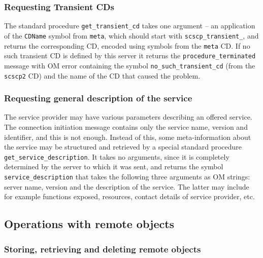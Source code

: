 \documentclass{amsart}
\begin{document}
\subsubsection{Requesting Transient CDs}

The standard procedure \verb|get_transient_cd| takes one argument -- an
application of the \verb|CDName| symbol from \verb|meta|, which should
start with \verb|scscp_transient_|, and returns the corresponding CD, encoded
using symbols from the \verb|meta| CD.  If no such transient CD is
defined by this server it returns the \verb|procedure_terminated| message
with OM error containing the symbol \verb|no_such_transient_cd| 
(from the \verb|scscp2| CD) and the name of the CD that caused the problem. 

\subsubsection{Requesting general description of the service}

The service provider may have various parameters describing an offered service.
The connection initiation message contains only the service name, version and 
identifier, and this is not enough. Instead of this, some meta-information
about the service may be structured and retrieved by a special standard
procedure \verb|get_service_description|. It takes no arguments, since it is
completely determined by the server to which it was sent, and returns the
symbol \verb|service_description| that takes the following three arguments as OM strings:
server name, version and the description of the service. The latter may include
for example functions exposed, resources, contact details of service provider, etc.

\subsection{Operations with remote objects}

\subsubsection{Storing, retrieving and deleting remote objects}
\end{document}
